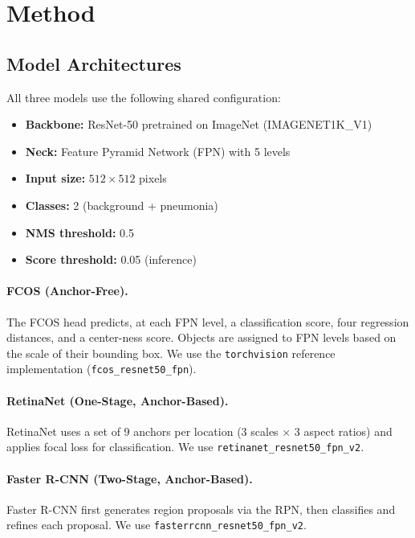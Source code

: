 \documentclass[11pt,a4paper]{article}
\begin{document}
\section{Method}
\label{sec:method}

\subsection{Model Architectures}

All three models use the following shared configuration:
\begin{itemize}[nosep]
    \item \textbf{Backbone:} ResNet-50 pretrained on ImageNet (IMAGENET1K\_V1)
    \item \textbf{Neck:} Feature Pyramid Network (FPN) with 5 levels
    \item \textbf{Input size:} $512 \times 512$ pixels
    \item \textbf{Classes:} 2 (background + pneumonia)
    \item \textbf{NMS threshold:} 0.5
    \item \textbf{Score threshold:} 0.05 (inference)
\end{itemize}

\paragraph{FCOS (Anchor-Free).}
The FCOS head predicts, at each FPN level, a classification score, four regression distances, and a center-ness score. Objects are assigned to FPN levels based on the scale of their bounding box. We use the \texttt{torchvision} reference implementation (\texttt{fcos\_\allowbreak resnet50\_\allowbreak fpn}).

\paragraph{RetinaNet (One-Stage, Anchor-Based).}
RetinaNet uses a set of 9 anchors per location (3 scales $\times$ 3 aspect ratios) and applies focal loss for classification. We use \texttt{retinanet\_\allowbreak resnet50\_\allowbreak fpn\_v2}.

\paragraph{Faster R-CNN (Two-Stage, Anchor-Based).}
Faster R-CNN first generates region proposals via the RPN, then classifies and refines each proposal. We use \texttt{fasterrcnn\_\allowbreak resnet50\_\allowbreak fpn\_v2}.
\end{document}
